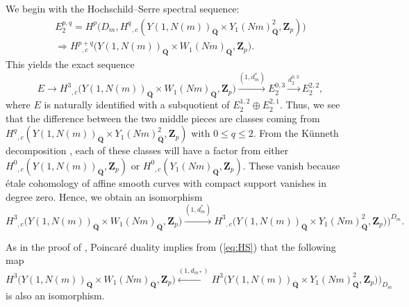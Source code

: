 \documentclass[10pt,letterpaper]{amsart}
\theoremstyle{plain}
\theoremstyle{definition}
\theoremstyle{definition}
\theoremstyle{plain}
\theoremstyle{plain}
\theoremstyle{plain}
\theoremstyle{remark}
\numberwithin{equation}{section}
\DeclareMathOperator{\et}{\acute{e}t}
\newcommand{\Q}{\mathbf{Q}}
\newcommand{\Z}{\mathbf{Z}}
\begin{document}
We begin with the Hochschild--Serre spectral sequence:
\begin{equation*}\begin{aligned}
     E_2^{p,q}=H^p\bigl(D_m,H^q_{\et,c}(Y(1,N(m))_{\overline{\Q}}\times Y_1(Nm)^2_{\overline{\Q}},\Z_p)\bigr)\\ \Rightarrow H^{p+q}_{\et,c}\bigl(Y(1,N(m))_{\overline{\Q}}\times W_1(Nm)_{\overline{\Q}},\Z_p\bigr).
\end{aligned}
\end{equation*}
This yields the exact sequence
\begin{equation}\label{eq:HS}
    E\longrightarrow H^3_{\et,c}\bigl(Y(1,N(m))_{\overline{\Q}}\times W_1(Nm)_{\overline{\Q}},\Z_p\bigr)\xrightarrow{(1,d_m^{*})} E_2^{0,3}\xrightarrow{d_2^{0,3}} E_2^{2,2},
\end{equation}
where $E$ is naturally identified with a subquotient of $E_2^{1,2}\oplus E_2^{2,1}$. Thus, we see that the difference between the two middle pieces are classes coming from $H^q_{\et,c}(Y(1,N(m))_{\overline{\Q}}\times Y_1(Nm)^2_{\overline{\Q}},\Z_p)$ with $0\leq q\le 2$. From the K\"unneth decomposition \cite[Thm.~22.4]{milne-lecture}, each of these classes will have a factor from either $H^0_{\et,c}(Y(1,N(m))_{\overline{\Q}},\Z_p)$ or $H^0_{\et,c}(Y_1(Nm)_{\overline{\Q}},\Z_p)$. These vanish because {\'e}tale cohomology of affine smooth curves with compact support vanishes in degree zero.
Hence, we obtain an isomorphism
\begin{equation}\label{dmpullback}
    H^3_{\et,c}\bigl(Y(1,N(m))_{\overline{\Q}}\times W_1(Nm)_{\overline{\Q}},\Z_p\bigr)\xrightarrow{(1,d_m^{*})}H^3_{\et,c}\bigl(Y(1,N(m))_{\overline{\Q}}\times Y_1(Nm)^2_{\overline{\Q}},\Z_p)\bigr)^{D_m}.\nonumber
\end{equation}

As in the proof of \cite[Lem.~1.8]{DR2}, Poincar\'e duality implies from (\ref{eq:HS}) that the following map
\begin{equation}\label{dmpushforward}
    H^3_{\et}\bigl(Y(1,N(m))_{\overline{\Q}}\times W_1(Nm)_{\overline{\Q}},\Z_p\bigr)\xleftarrow{(1,d_{m*})} H^3_{\et}\bigl(Y(1,N(m))_{\overline{\Q}}\times Y_1(Nm)^2_{\overline{\Q}},\Z_p)\bigr)_{D_m}
\end{equation}
is also an isomorphism.
\end{document}
